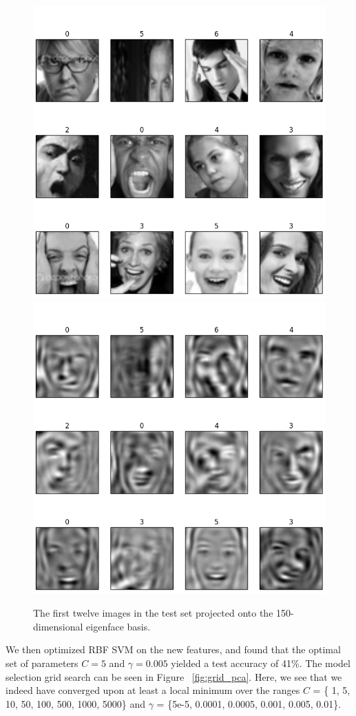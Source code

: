 \documentclass[10pt, twocolumn, twoside]{article}
\begin{document}
\begin{figure}[!htbp]
\centering
\includegraphics[width=0.8\linewidth]{original_test}
\includegraphics[width=0.8\linewidth]{projected_test}
\caption{\label{fig:pca} The first twelve images in the test set projected onto the
150-dimensional eigenface basis.}
\end{figure}



We then optimized RBF SVM on the new features, and found that the optimal set of
parameters $C=5$ and $\gamma = 0.005$ yielded a test accuracy of 41\%. The model
selection grid search can be seen in Figure ~\ref{fig:grid_pca}. Here, we see that
we indeed have converged upon at least a local minimum over the ranges $C$ = \{
1, 5, 10, 50, 100, 500, 1000, 5000\} and $\gamma$ = \{5e-5, 0.0001, 0.0005, 0.001,
0.005, 0.01\}.
\end{document}
